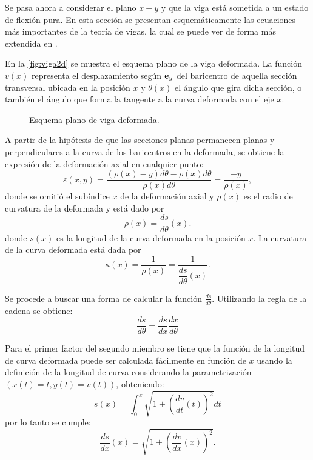 Se pasa ahora a considerar el plano $x-y$ y que la viga está sometida a un estado de flexión pura. %
%
En esta sección se presentan esquemáticamente las ecuaciones más importantes de la teoría de vigas, la cual se puede ver de forma más extendida en \citep{Timoshenko1940a}. %

En la \autoref{fig:viga2d} se muestra el esquema plano de la viga deformada. %
%
La función $v(x)$ representa el desplazamiento según ${\bf e}_y$ del baricentro de aquella sección transversal ubicada en la posición $x$ y $\theta(x)$ el ángulo que gira dicha sección, o también el ángulo que forma la tangente a la curva deformada con el eje $x$. %

\begin{figure}[htb]
	\centering
	\def\svgwidth{0.65\textwidth}
	
	\caption{Esquema plano de viga deformada.}
	\label{fig:viga2d}
\end{figure}
%
%

A partir de la hipótesis de que las secciones planas permanecen planas y perpendiculares a la curva de los baricentros en la deformada, se obtiene la expresión de la deformación axial en cualquier punto:
%
\begin{equation}
\varepsilon(x,y) = \frac{ (\rho(x) -y) d\theta - \rho(x) d \theta }{ \rho(x) d \theta} = \frac{-y}{\rho(x)},
\end{equation}
donde se omitió el subíndice $x$ de la deformación axial y $\rho(x)$ es el radio de curvatura de la deformada y está dado por
%
\begin{equation}
\rho(x) = \frac{ds}{d\theta}(x).
\end{equation}
%
donde $s(x)$ es la longitud de la curva deformada en la posición $x$.
%
La curvatura de la curva deformada está dada por
\begin{equation}
\kappa (x) = \frac{1}{\rho(x)} = \frac{1}{\dfrac{ds}{d \theta} (x)}.
\end{equation}

Se procede a buscar una forma de calcular la función $\frac{ds}{d\theta}$. %
Utilizando la regla de la cadena se obtiene:
%
\begin{equation}\label{eqn:dsdtheta}
\dfrac{ds}{d \theta} = \frac{ds}{dx} \frac{dx}{d\theta}
\end{equation}


Para el primer factor del segundo miembro se tiene que la función de la longitud de curva deformada puede ser calculada fácilmente en función de $x$ usando la definición de la longitud de curva considerando la parametrización $(x(t)=t,y(t)=v(t))$, obteniendo:
%
\begin{equation}
s(x) = \int_0^x \sqrt{1+  \left( \frac{d v}{d t}(t)\right)^2} dt
\end{equation}
%
por lo tanto se cumple:
\begin{equation}\label{eqn:dsdx}
\frac{ds}{dx} (x) = \sqrt{1+ \left( \frac{ d v}{d x}(x)  \right) ^2}.
\end{equation}

